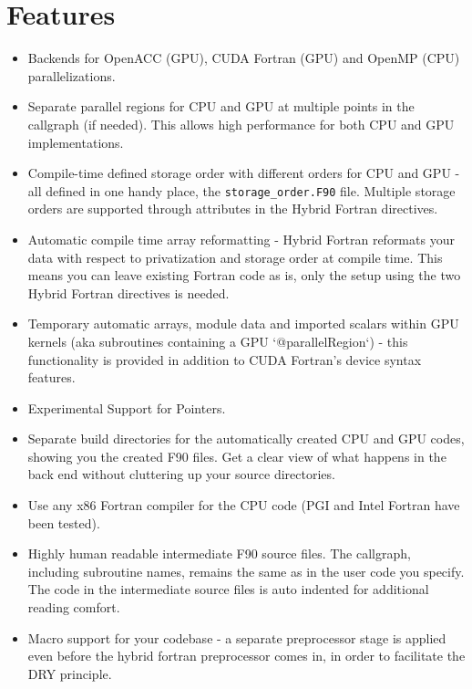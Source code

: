 \section{Features} \label{sec:features}
\begin{itemize}
 \item Backends for OpenACC (GPU), CUDA Fortran (GPU) and OpenMP (CPU) parallelizations.

 \item Separate parallel regions for CPU and GPU at multiple points in the callgraph (if needed). This allows high performance for both CPU and GPU implementations.

 \item Compile-time defined storage order with different orders for CPU and GPU - all defined in one handy place, the \verb|storage_order.F90| file. Multiple storage orders are supported through attributes in the Hybrid Fortran directives.

 \item Automatic compile time array reformatting - Hybrid Fortran reformats your data with respect to privatization and storage order at compile time. This means you can leave existing Fortran code as is, only the setup using the two Hybrid Fortran directives is needed.

 \item Temporary automatic arrays, module data and imported scalars within GPU kernels (aka subroutines containing a GPU `@parallelRegion`) - this functionality is provided in addition to CUDA Fortran's device syntax features.

 \item Experimental Support for Pointers.

 \item Separate build directories for the automatically created CPU and GPU codes, showing you the created F90 files. Get a clear view of what happens in the back end without cluttering up your source directories.

 \item Use any x86 Fortran compiler for the CPU code (PGI and Intel Fortran have been tested).

 \item Highly human readable intermediate F90 source files. The callgraph, including subroutine names, remains the same as in the user code you specify. The code in the intermediate source files is auto indented for additional reading comfort.

 \item Macro support for your codebase - a separate preprocessor stage is applied even before the hybrid fortran preprocessor comes in, in order to facilitate the DRY principle.


\end{itemize}
